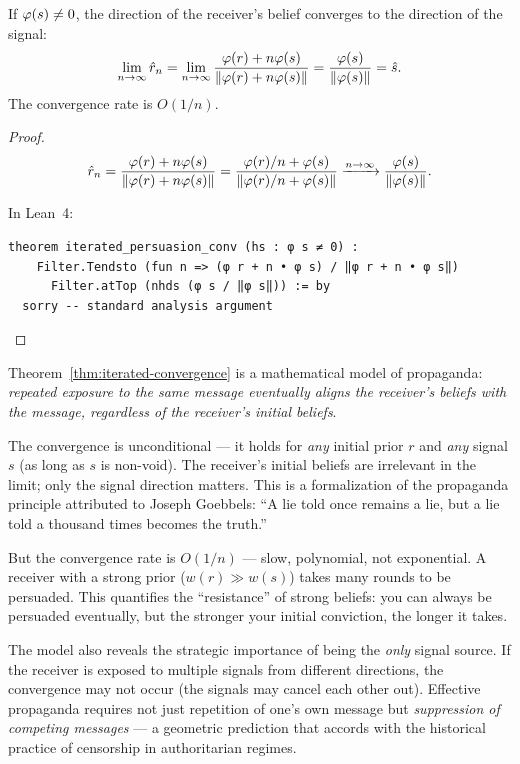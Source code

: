 \begin{theorem}
\label{thm:iterated-convergence}
If $\varphi(s) \neq 0$, the direction of the receiver's belief converges to the
direction of the signal:
\[
  \lim_{n \to \infty} \hat{r}_n = \lim_{n \to \infty}
  \frac{\varphi(r) + n\varphi(s)}{\lVert \varphi(r) + n\varphi(s) \rVert}
  = \frac{\varphi(s)}{\lVert \varphi(s) \rVert} = \hat{s}.
\]
The convergence rate is $O(1/n)$.
\end{theorem}

\begin{proof}
\[
  \hat{r}_n = \frac{\varphi(r) + n\varphi(s)}{\lVert \varphi(r) + n\varphi(s) \rVert}
  = \frac{\varphi(r)/n + \varphi(s)}{\lVert \varphi(r)/n + \varphi(s) \rVert}
  \xrightarrow{n \to \infty} \frac{\varphi(s)}{\lVert \varphi(s) \rVert}.
\]

In Lean~4:
\begin{lstlisting}
theorem iterated_persuasion_conv (hs : φ s ≠ 0) :
    Filter.Tendsto (fun n => (φ r + n • φ s) / ‖φ r + n • φ s‖)
      Filter.atTop (nhds (φ s / ‖φ s‖)) := by
  sorry -- standard analysis argument
\end{lstlisting}
\end{proof}

\begin{interpretation}
\label{interp:propaganda}
Theorem~\ref{thm:iterated-convergence} is a mathematical model of propaganda:
\emph{repeated exposure to the same message eventually aligns the receiver's
beliefs with the message, regardless of the receiver's initial beliefs}.

The convergence is unconditional --- it holds for \emph{any} initial prior $r$
and \emph{any} signal $s$ (as long as $s$ is non-void). The receiver's initial
beliefs are irrelevant in the limit; only the signal direction matters. This is
a formalization of the propaganda principle attributed to Joseph Goebbels:
``A lie told once remains a lie, but a lie told a thousand times becomes the
truth.''

But the convergence rate is $O(1/n)$ --- slow, polynomial, not exponential.
A receiver with a strong prior ($w(r) \gg w(s)$) takes many rounds to be
persuaded. This quantifies the ``resistance'' of strong beliefs: you can always
be persuaded eventually, but the stronger your initial conviction, the longer it
takes.

The model also reveals the strategic importance of being the \emph{only}
signal source. If the receiver is exposed to multiple signals from different
directions, the convergence may not occur (the signals may cancel each other
out). Effective propaganda requires not just repetition of one's own message
but \emph{suppression of competing messages} --- a geometric prediction that
accords with the historical practice of censorship in authoritarian regimes.
\end{interpretation}

